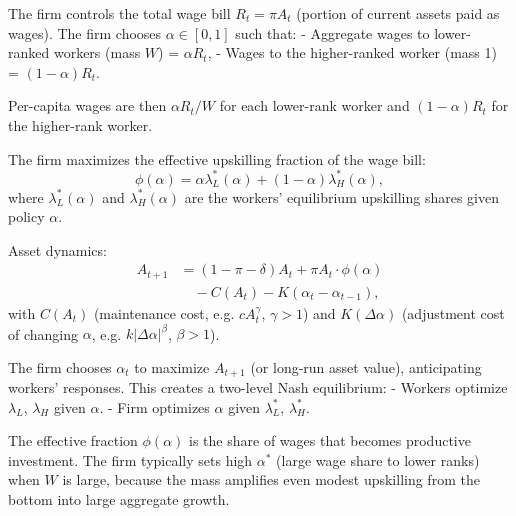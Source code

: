\documentclass[11pt]{article}
\begin{document}
The firm controls the total wage bill $R_t = \pi A_t$ (portion of current assets paid as wages). The firm chooses $\alpha \in [0,1]$ such that:
- Aggregate wages to lower-ranked workers (mass $W$) = $\alpha R_t$,
- Wages to the higher-ranked worker (mass 1) = $(1-\alpha) R_t$.

Per-capita wages are then $\alpha R_t / W$ for each lower-rank worker and $(1-\alpha) R_t$ for the higher-rank worker.

The firm maximizes the effective upskilling fraction of the wage bill:
\[
\phi(\alpha) = \alpha \lambda_L^*(\alpha) + (1-\alpha) \lambda_H^*(\alpha),
\]
where $\lambda_L^*(\alpha)$ and $\lambda_H^*(\alpha)$ are the workers' equilibrium upskilling shares given policy $\alpha$.

Asset dynamics:
\begin{align*}
A_{t+1} &= (1 - \pi - \delta) A_t + \pi A_t \cdot \phi(\alpha) \\
        &\quad - C(A_t) - K(\alpha_t - \alpha_{t-1}),
\end{align*}
with $C(A_t)$ (maintenance cost, e.g. $c A_t^\gamma$, $\gamma > 1$) and $K(\Delta\alpha)$ (adjustment cost of changing $\alpha$, e.g. $k |\Delta\alpha|^\beta$, $\beta > 1$).

The firm chooses $\alpha_t$ to maximize $A_{t+1}$ (or long-run asset value), anticipating workers' responses. This creates a two-level Nash equilibrium:
- Workers optimize $\lambda_L$, $\lambda_H$ given $\alpha$.
- Firm optimizes $\alpha$ given $\lambda_L^*$, $\lambda_H^*$.

The effective fraction $\phi(\alpha)$ is the share of wages that becomes productive investment. The firm typically sets high $\alpha^*$ (large wage share to lower ranks) when $W$ is large, because the mass amplifies even modest upskilling from the bottom into large aggregate growth.
\end{document}
